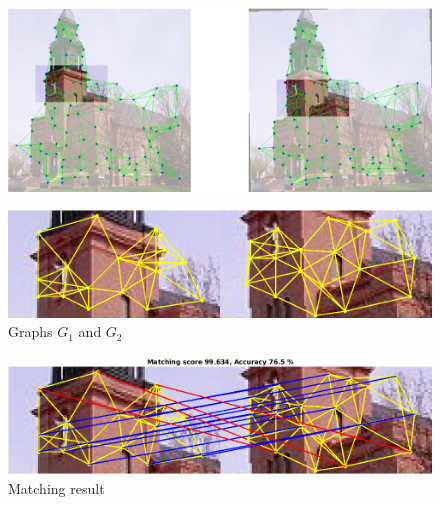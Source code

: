 \documentclass[
	fontsize=12pt,
	paper=a4,
	twoside=false,
	numbers=noenddot,
	plainheadsepline,
	toc=listof,
	toc=bibliography
]{scrartcl}
\begin{document}
\begin{figure} [htb] \centering
	\includegraphics[scale = 0.35]{test5/subregions.png}
\end{figure}
\begin{figure} [hb] \centering
	\includegraphics[scale = 0.4]{test5/subgraphs.png}
	\caption{Graphs $G_1$ and $G_2$}
\end{figure}
\begin{figure} [htb] \centering
	\includegraphics[scale = 0.4]{test5/matching_result.png}
	\caption{ Matching result}
\end{figure}

\FloatBarrier
\end{document}

